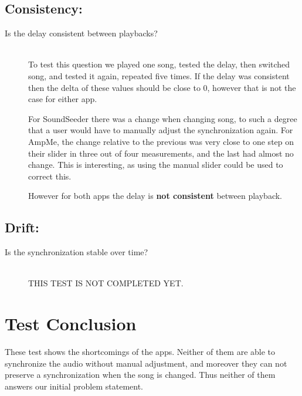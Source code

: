 \subsection*{Consistency:}
\begin{description}
    \item[Is the delay consistent between playbacks?] \hfill \\
    To test this question we played one song, tested the delay, then switched song, and tested it again, repeated five times. 
    If the delay was consistent then the delta of these values should be close to $0$, however that is not the case for either app. 

    For SoundSeeder there was a change when changing song, to such a degree that a user would have to manually adjust the synchronization again.
    For AmpMe, the change relative to the previous was very close to one step on their slider in three out of four measurements, and the last had almost no change. 
    This is interesting, as using the manual slider could be used to correct this. 

    However for both apps the delay is \textbf{not consistent} between playback.
\end{description}

\subsection*{Drift:}
\begin{description}
    \item[Is the synchronization stable over time?] \hfill \\
    THIS TEST IS NOT COMPLETED YET. 
\end{description}

\section{Test Conclusion}
These test shows the shortcomings of the apps. 
Neither of them are able to synchronize the audio without manual adjustment, and moreover they can not preserve a synchronization when the song is changed. 
Thus neither of them answers our initial problem statement. 
